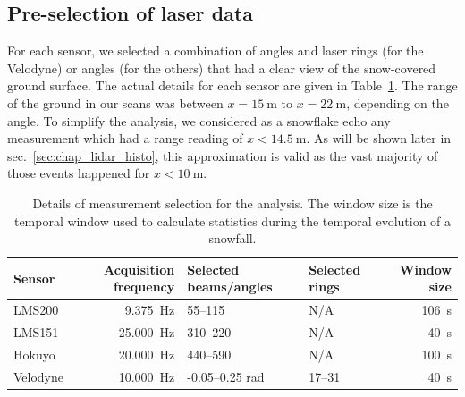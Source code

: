 \subsection{Pre-selection of laser data}
For each sensor, we selected a combination of angles and laser rings (for the Velodyne) or angles (for the others) that had a clear view of the snow-covered ground surface. The actual details for each sensor are given in Table~\ref{tab:selectionScans}. The range of the ground in our scans was between $x = \SI{15}{\meter}$ to $x=\SI{22}{\meter}$, depending on the angle. To simplify the analysis, we considered as a snowflake echo any measurement which had a range reading of $x<\SI{14.5}{\meter}$. As will be shown later in sec.~\ref{sec:chap_lidar_histo}, this approximation is valid as the vast majority of those events happened for $x<\SI{10}{\meter}$. %

\begin{table}[h]
    \centering
    \begin{tabular}{@{}lrllr@{}}
        \toprule
        \textbf{Sensor} & \textbf{Acquisition frequency} & \textbf{Selected beams/angles} & \textbf{Selected rings} & \textbf{Window size} \\
        \hline
        LMS200          & \SI{9.375}{\Hz}       & 55--115                & N/A               & ~\SI{106}{\second} \\
        LMS151          & \SI{25.000}{\Hz}      & 310--220               & N/A               & ~\SI{40}{\second}  \\
        Hokuyo          & \SI{20.000}{\Hz}      & 440--590               & N/A               & ~\SI{100}{\second} \\
        Velodyne        & \SI{10.000}{\Hz}      & -0.05--0.25 rad        & 17--31            & ~\SI{40}{\second}  \\
        \bottomrule
    \end{tabular}
    \caption{Details of measurement selection for the analysis. The window size is the temporal window used to calculate statistics during the temporal evolution of a snowfall.}
    \label{tab:selectionScans}
\end{table}

